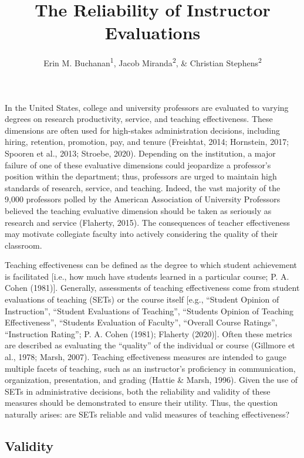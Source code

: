 \documentclass[
  man]{apa7}
\title{The Reliability of Instructor Evaluations}
\author{Erin M. Buchanan\textsuperscript{1}, Jacob Miranda\textsuperscript{2}, \& Christian Stephens\textsuperscript{2}}
\date{}
\affiliation{\vspace{0.5cm}\textsuperscript{1} Harrisburg University of Science and Technology\\\textsuperscript{2} University of Alabama}
\begin{document}
\maketitle

In the United States, college and university professors are evaluated to
varying degrees on research productivity, service, and teaching
effectiveness. These dimensions are often used for high-stakes
administration decisions, including hiring, retention, promotion, pay,
and tenure (Freishtat, 2014; Hornstein, 2017; Spooren et al., 2013; Stroebe, 2020).
Depending on the institution, a major failure of one of these evaluative
dimensions could jeopardize a professor's position within the
department; thus, professors are urged to maintain high standards of
research, service, and teaching. Indeed, the vast majority of the 9,000
professors polled by the American Association of University Professors
believed the teaching evaluative dimension should be taken as seriously
as research and service (Flaherty, 2015). The consequences of teacher
effectiveness may motivate collegiate faculty into actively considering
the quality of their classroom.

Teaching effectiveness can be defined as the degree to which student
achievement is facilitated {[}i.e., how much have students learned in a
particular course; P. A. Cohen (1981){]}. Generally, assessments of teaching
effectiveness come from student evaluations of teaching (SETs) or the
course itself {[}e.g., ``Student Opinion of Instruction'', ``Student
Evaluations of Teaching'', ``Students Opinion of Teaching Effectiveness'',
``Students Evaluation of Faculty'', ``Overall Course Ratings'', ``Instruction
Rating''; P. A. Cohen (1981); Flaherty (2020){]}. Often these metrics are described as
evaluating the ``quality'' of the individual or course (Gillmore et al., 1978; Marsh, 2007). Teaching effectiveness measures are intended to gauge
multiple facets of teaching, such as an instructor's proficiency in
communication, organization, presentation, and grading (Hattie \& Marsh, 1996).
Given the use of SETs in administrative decisions, both the reliability
and validity of these measures should be demonstrated to ensure their
utility. Thus, the question naturally arises: are SETs reliable and
valid measures of teaching effectiveness?

\hypertarget{validity}{%
\subsection{Validity}\label{validity}}
\end{document}
